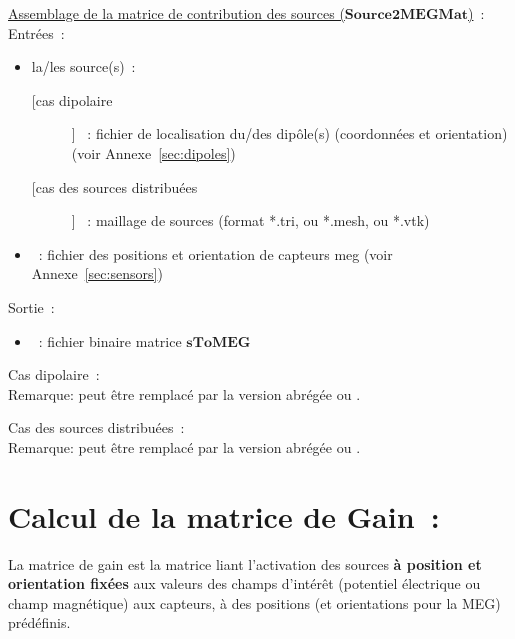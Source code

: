\bigskip

\noindent
\underline{Assemblage de la matrice de contribution des sources ($\mathbf{Source2MEGMat}$)}~:\\
Entrées~:
\begin{itemize}
    \item la/les source(s)~:
    \begin{description}
        \item [[cas dipolaire]] ~: fichier de localisation du/des dipôle(s) (coordonnées et orientation) (voir Annexe~\ref{sec:dipoles}) 
        \item [[cas des sources distribuées]] ~: maillage de sources (format *.tri, ou *.mesh, ou *.vtk)
    \end{description}
    \item {}~: fichier des positions et orientation de capteurs meg (voir Annexe~\ref{sec:sensors})
\end{itemize}
Sortie~: 
\begin{itemize}
    \item {}~: fichier binaire matrice $\mathbf{sToMEG}$
\end{itemize}

\medskip

\noindent
Cas dipolaire~:\\
\noindent
{}
\medskip
Remarque:  peut être remplacé par la version abrégée  ou .

\medskip

\noindent
Cas des sources distribuées~:\\
\noindent
{}
\medskip
Remarque:  peut être remplacé par la version abrégée  ou .

\section{Calcul de la matrice de Gain~:}
\label{sect: command gain}

La matrice de gain est la matrice liant l'activation des sources \textbf{à position et orientation fixées} aux valeurs des champs d'intérêt (potentiel électrique ou champ magnétique) aux capteurs, à des positions (et orientations pour la MEG)  prédéfinis. 

